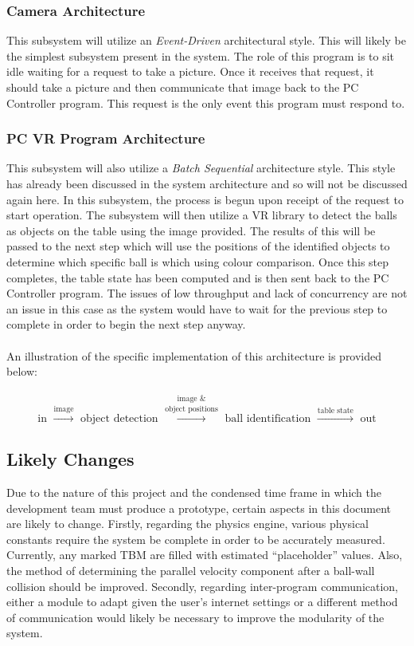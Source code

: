 \documentclass[titlepage]{article}
\begin{document}
\subsubsection{Camera Architecture}
This subsystem will utilize an \textit{Event-Driven} architectural style. This will likely be the simplest subsystem present in the system. The role of this program is to sit idle waiting for a request to take a picture. Once it receives that request, it should take a picture and then communicate that image back to the PC Controller program. This request is the only event this program must respond to.
\newpage
\subsubsection{PC VR Program Architecture}
This subsystem will also utilize a \textit{Batch Sequential} architecture style. This style has already been discussed in the system architecture and so will not be discussed again here. In this subsystem, the process is begun upon receipt of the request to start operation. The subsystem will then utilize a VR library to detect the balls as objects on the table using the image provided. The results of this will be passed to the next step which will use the positions of the identified objects to determine which specific ball is which using colour comparison. Once this step completes, the table state has been computed and is then sent back to the PC Controller program. The issues of low throughput and lack of concurrency are not an issue in this case as the system would have to wait for the previous step to complete in order to begin the next step anyway.\\~\\

An illustration of the specific implementation of this architecture is provided below:\\~\\
$$\text{in } \xrightarrow{\text{image}} \text{ object detection } \overset{\text{image \&}}{\xrightarrow{\text{object positions}}} \text{ ball identification } \xrightarrow{\text{table state}} \text{ out}$$
\label{fig:PC VR Architecture}
\subsection{Likely Changes}
Due to the nature of this project and the condensed time frame in which the development team must produce a prototype, certain aspects in this document are likely to change. Firstly, regarding the physics engine, various physical constants require the system be complete in order to be accurately measured. Currently, any marked TBM are filled with estimated ``placeholder'' values. Also, the method of determining the parallel velocity component after a ball-wall collision should be improved. Secondly, regarding inter-program communication, either a module to adapt given the user's internet settings or a different method of communication would likely be necessary to improve the modularity of the system.
\end{document}

